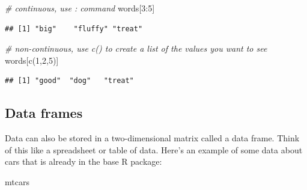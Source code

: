 \documentclass[
]{book}
\newenvironment{Shaded}{\begin{snugshade}}{\end{snugshade}}
\newcommand{\CommentTok}[1]{\textcolor[rgb]{0.56,0.35,0.01}{\textit{#1}}}
\newcommand{\DecValTok}[1]{\textcolor[rgb]{0.00,0.00,0.81}{#1}}
\newcommand{\FunctionTok}[1]{\textcolor[rgb]{0.00,0.00,0.00}{#1}}
\newcommand{\NormalTok}[1]{#1}
\newcommand{\SpecialCharTok}[1]{\textcolor[rgb]{0.00,0.00,0.00}{#1}}
\begin{document}
\begin{Shaded}
\begin{Highlighting}[]
\CommentTok{\# continuous, use : command}
\NormalTok{words[}\DecValTok{3}\SpecialCharTok{:}\DecValTok{5}\NormalTok{]}
\end{Highlighting}
\end{Shaded}

\begin{verbatim}
## [1] "big"    "fluffy" "treat"
\end{verbatim}

\begin{Shaded}
\begin{Highlighting}[]
\CommentTok{\# non{-}continuous, use c() to create a list of the values you want to see}
\NormalTok{words[}\FunctionTok{c}\NormalTok{(}\DecValTok{1}\NormalTok{,}\DecValTok{2}\NormalTok{,}\DecValTok{5}\NormalTok{)]}
\end{Highlighting}
\end{Shaded}

\begin{verbatim}
## [1] "good"  "dog"   "treat"
\end{verbatim}

\hypertarget{data-frames}{%
\subsection{Data frames}\label{data-frames}}

Data can also be stored in a two-dimensional matrix called a data frame. Think of this like a spreadsheet or table of data. Here's an example of some data about cars that is already in the base R package:

\begin{Shaded}
\begin{Highlighting}[]
\NormalTok{mtcars}
\end{Highlighting}
\end{Shaded}
\end{document}
